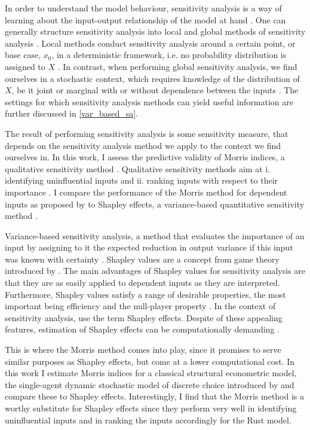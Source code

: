 In order to understand the model behaviour, sensitivity analysis is a way of learning about the input-output relationship of the model at hand \citep{BP16}. One can generally structure sensitivity analysis into local and global methods of sensitivity analysis \citep{BP16}. Local methods conduct sensitivity analysis around a certain point, or base case, $x_0$, in a deterministic framework, i.e. no probability distribution is assigned to $X$ \citep{BP16}. In contrast, when performing global sensitivity analysis, we find ourselves in a stochastic context, which requires knowledge of the distribution of $X$, be it joint or marginal with or without dependence between the inputs \citep{ST02}. The settings for which sensitivity analysis methods can yield useful information are further discussed in \cref{var_based_sa}.

The result of performing sensitivity analysis is some sensitivity measure, that depends on the sensitivity analysis method we apply to the context we find ourselves in. In this work, I assess the predictive validity of Morris indices, a qualitative sensitivity method \citep{M91}. Qualitative sensitivity methods aim at i. identifying uninfluential inputs and ii. ranking inputs with respect to their importance \citep{BP16}. I compare the performance of the Morris method for dependent inputs as proposed by \citet{GM17} to Shapley effects, a variance-based quantitative sensitivity method \citep{O14}.

Variance-based sensitivity analysis, a method that evaluates the importance of an input by assigning to it the expected reduction in output variance if this input was known with certainty \citep{BP16}. Shapley values are a concept from game theory introduced by \citet{S53}. The main advantages of Shapley values for sensitivity analysis are that they are as easily applied to dependent inputs as they are interpreted. Furthermore, Shapley values satisfy a range of desirable properties, the most important being efficiency and the null-player property \citet{S53, O14}. In the context of sensitivity analysis, \citet{SNS16} use the term Shapley effects. Despite of these appealing features, estimation of Shapley effects can be computationally demanding \citep{SNS16}.

This is where the Morris method comes into play, since it promises to serve similar purposes as Shapley effects, but come at a lower computational cost. In this work I estimate Morris indices for a classical structural econometric model, the single-agent dynamic stochastic model of discrete choice introduced by \citet{R87} and compare these to Shapley effects. Interestingly, I find that the Morris method is a worthy substitute for Shapley effects since they perform very well in identifying uninfluential inputs and in ranking the inputs accordingly for the Rust model.

